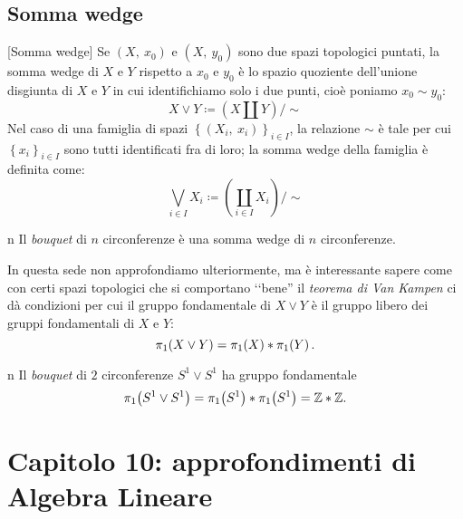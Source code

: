 \subsection{Somma wedge}
\begin{definition}{}[Somma wedge]
	Se $\left(X,\ x_0\right)$ e $\left(X,\ y_0\right)$ sono due spazi topologici puntati, la somma wedge di $X$ e $Y$ rispetto a $x_0$ e $y_0$ è lo spazio quoziente dell'unione disgiunta di $X$ e $Y$ in cui identifichiamo solo i due punti, cioè poniamo $x_0\sim y_0$:
	\begin{equation*}
		X\vee Y\coloneqq \left(X\amalg Y\right)/\sim
	\end{equation*}
Nel caso di una famiglia di spazi $\left\{\left(X_i,\ x_i\right)\right\}_{i\in I}$, la relazione $\sim$ è tale per cui $\left\{x_i\right\}_{i\in I}$ sono tutti identificati fra di loro; la somma wedge della famiglia è definita come:
\begin{equation*}
	\bigvee_{i\in I} X_i \coloneqq \left(\coprod_{i\in I}X_i\right)/\sim
\end{equation*}
\end{definition}
\begin{example}{n}
	Il \textit{bouquet} di $n$ circonferenze è una somma wedge di $n$ circonferenze.
\end{example}
In questa sede non approfondiamo ulteriormente, ma è interessante sapere come con certi spazi topologici che si comportano ‘‘bene'' il \textit{teorema di Van Kampen} ci dà condizioni per cui il gruppo fondamentale di $X\vee Y$ è il gruppo libero dei gruppi fondamentali di $X$ e $Y$:
\begin{equation*}
	\homotopy[1]{X\vee Y}=\homotopy[1]{X}\ast\homotopy[1]{Y}.
\end{equation*}
\begin{example}{n}
	Il \textit{bouquet} di $2$ circonferenze $S^1\vee S^1$ ha gruppo fondamentale
	\begin{equation*}
	\homotopy[1]{S^1\vee S^1}=\homotopy[1]{S^1}\ast\homotopy[1]{S^1}=\Z\ast\Z.
	\end{equation*}
\end{example}
\section{Capitolo 10: approfondimenti di Algebra Lineare}
